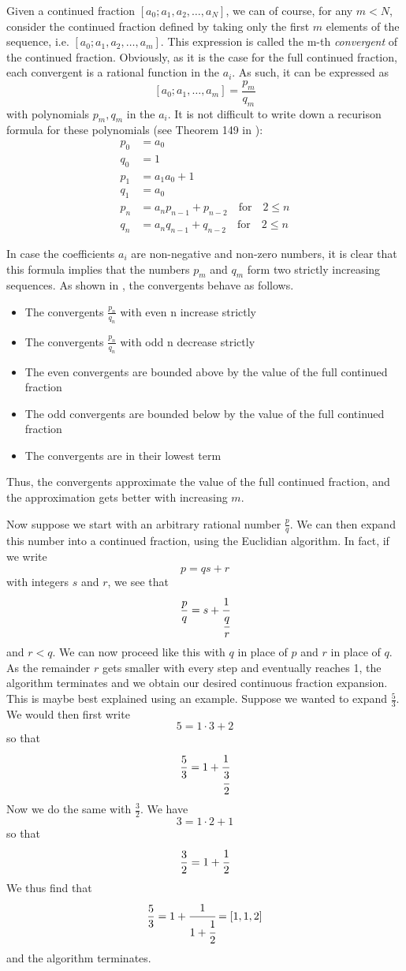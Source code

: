 \documentclass[a4paper, draft]{article}
\theoremstyle{own}
\theoremstyle{remark}
\begin{document}
Given a continued fraction $[a_0;a_1, a_2, \dots, a_N]$, we can of course, for any $m < N$, consider the continued fraction defined by taking only the first $m$ elements of the sequence, i.e. $[a_0;a_1, a_2, \dots, a_m]$. This expression is called the m-th \emph{convergent} of the continued fraction. Obviously, as it is the case for the full continued fraction, each convergent is a rational function in the $a_i$. As such, it can be expressed as
$$
[a_0; a_1, \dots, a_m] = \frac{p_m}{q_m}
$$
with polynomials $p_m, q_m$ in the $a_i$. It is not difficult to write down a recurison formula for these polynomials (see Theorem 149 in \cite{HW0}):
\begin{align*}
p_0 &= a_0 \\
q_0 &= 1 \\
p_1 &= a_1 a_0 + 1 \\
q_1 &= a_0 \\
p_n &= a_n p_{n-1} + p_{n-2} \quad \text{for} \quad 2 \leq n \\
q_n &= a_n q_{n-1} + q_{n-2} \quad \text{for} \quad 2 \leq n 
\end{align*}	

In case the coefficients $a_i$ are non-negative and non-zero numbers, it is clear that this formula implies that the numbers $p_m$ and $q_m$ form two strictly increasing sequences. As shown in \cite{HW}, the convergents behave as follows.
\begin{itemize}
	\item The convergents $\frac{p_n}{q_n}$ with even n increase strictly
	\item The convergents $\frac{p_n}{q_n}$ with odd n decrease strictly
	\item The even convergents are bounded above by the value of the full continued fraction
	\item The odd convergents are bounded below by the value of the full continued fraction
	\item The convergents are in their lowest term
\end{itemize}


Thus, the convergents approximate the value of the full continued fraction, and the approximation gets better with increasing $m$. 

Now suppose we start with an arbitrary rational number $\frac{p}{q}$. We can then expand this number into a continued fraction, using the Euclidian algorithm. In fact, if we write
$$
p = qs + r
$$
with integers $s$ and $r$, we see that 
$$
\frac{p}{q} = s + \cfrac{1}{\cfrac{q}{r}}
$$
and $r < q$. We can now proceed like this with $q$ in place of $p$ and $r$ in place of $q$. As the remainder $r$ gets smaller with every step and eventually reaches 1, the algorithm terminates and we obtain our desired continuous fraction expansion. This is maybe best explained using an example. Suppose we wanted to expand $\frac{5}{3}$. We would then first write
$$
5 = 1 \cdot 3 + 2
$$
so that
$$
\frac{5}{3} = 1 + \cfrac{1}{\cfrac{3}{2}}
$$
Now we do the same with $\frac{3}{2}$. We have
$$
3 = 1 \cdot 2 + 1
$$
so that
$$
\frac{3}{2} = 1 + \cfrac{1}{2}
$$
We thus find that
$$
\frac{5}{3} = 1 + \cfrac{1}{1 + \cfrac{1}{2}} = [1, 1, 2]
$$
and the algorithm terminates.
\end{document}
